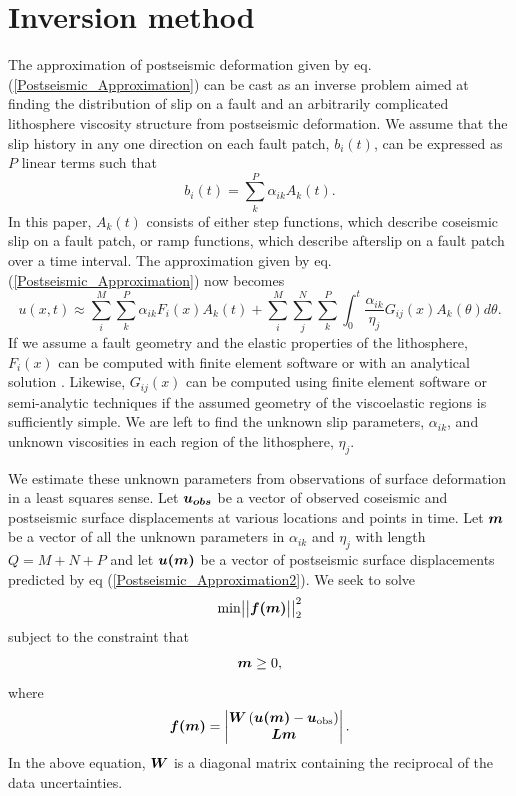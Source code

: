 \documentclass[extra]{gji}
\begin{document}
\section{Inversion method}
The approximation of postseismic deformation given by eq.
(\ref{Postseismic_Approximation}) can be cast as an inverse problem
aimed at finding the distribution of slip on a fault and an
arbitrarily complicated lithosphere viscosity structure from
postseismic deformation. We assume that the slip history in any one
direction on each fault patch, $b_i(t)$, can be expressed as $P$ linear
terms such that
\begin{equation}
  b_i(t) = \sum_k^P \alpha_{ik}A_k(t).
\end{equation}
In this paper, $A_k(t)$ consists of either step functions, which
describe coseismic slip on a fault patch, or ramp functions, which
describe afterslip on a fault patch over a time interval.  The
approximation given by eq. (\ref{Postseismic_Approximation}) now
becomes
\begin{equation}\label{Postseismic_Approximation2}
u(x,t) \approx \sum_i^M\sum_k^P\alpha_{ik}F_i(x)A_k(t) + 
               \sum_i^M\sum_j^N\sum_k^P\int_0^t\frac{\alpha_{ik}}{\eta_j}G_{ij}(x)A_k(\theta)d\theta.
\end{equation}
If we assume a fault geometry and the elastic properties of the
lithosphere, $F_i(x)$ can be computed with finite element software or
with an analytical solution \citep[e.g.][]{O1992,M2007}. Likewise,
$G_{ij}(x)$ can be computed using finite element software or
semi-analytic techniques \citep[e.g.][]{P1997,BF2010,FM2006} if the
assumed geometry of the viscoelastic regions is sufficiently simple.
We are left to find the unknown slip parameters, $\alpha_{ik}$, and
unknown viscosities in each region of the lithosphere, $\eta_j$.

We estimate these unknown parameters from observations of surface
deformation in a least squares sense. Let $\mitbf{u_{obs}}$ be a vector of
observed coseismic and postseismic surface displacements at various
locations and points in time.  Let $\mitbf{m}$ be a vector of all the
unknown parameters in $\alpha_{ik}$ and $\eta_j$ with length $Q=M+N+P$
and let $\mitbf{u(m)}$ be a vector of postseismic surface displacements
predicted by eq (\ref{Postseismic_Approximation2}). We seek to solve
\begin{equation}\label{Inverse_Problem}
  \mathrm{min}
  \big|\big|\mitbf{f(m)}\big|\big|_2^2
\end{equation}
subject to the constraint that
\begin{equation}
  \mitbf{m}\geq0,
\end{equation}
where 
\begin{equation}
  \mitbf{f(m)} = 
    \begin{vmatrix}
      \mitbf{W}\left(\mitbf{u(m)}-\mitbf{u}_{\mathrm{obs}}\right)\\
      \mitbf{Lm}\\
    \end{vmatrix} .
\end{equation}  
In the above equation, $\mitbf{W}$ is a diagonal matrix containing the
reciprocal of the data uncertainties. 
\end{document}
